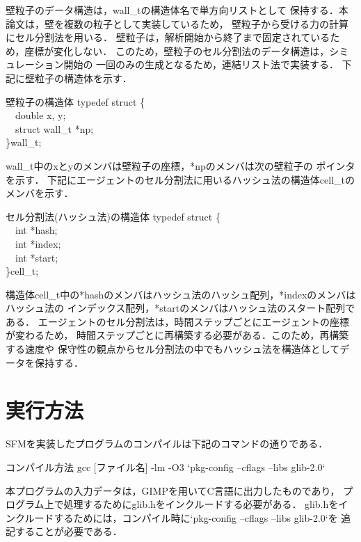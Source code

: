 壁粒子のデータ構造は，wall\_tの構造体名で単方向リストとして
保持する．本論文は，壁を複数の粒子として実装しているため，
壁粒子から受ける力の計算にセル分割法を用いる．
壁粒子は，解析開始から終了まで固定されているため，座標が変化しない．
このため，壁粒子のセル分割法のデータ構造は，シミュレーション開始の
一回のみの生成となるため，連結リスト法で実装する．
下記に壁粒子の構造体を示す．
%
\begin{itembox}[l]{壁粒子の構造体}
typedef struct \{\\
　double x, y;\\
　struct wall\_t *np;\\ 
\}wall\_t;
\end{itembox}
%
wall\_t中のxとyのメンバは壁粒子の座標，*npのメンバは次の壁粒子の
ポインタを示す．
下記にエージェントのセル分割法に用いるハッシュ法の構造体cell\_tの
メンバを示す．
\begin{itembox}[l]{セル分割法(ハッシュ法)の構造体}
typedef struct \{\\
　int *hash;\\
　int *index;\\
　int *start;\\
\}cell\_t;
\end{itembox}
構造体cell\_t中の*hashのメンバはハッシュ法のハッシュ配列，*indexのメンバはハッシュ法の
インデックス配列，*startのメンバはハッシュ法のスタート配列である．
エージェントのセル分割法は，時間ステップごとにエージェントの座標が変わるため，
時間ステップごとに再構築する必要がある．このため，再構築する速度や
保守性の観点からセル分割法の中でもハッシュ法を構造体としてデータを保持する．

\section{実行方法}
SFMを実装したプログラムのコンパイルは下記のコマンドの通りである．
\begin{itembox}[l]{コンパイル方法}
  gcc [ファイル名] -lm -O3 `pkg-config --cflags --libs glib-2.0`
\end{itembox}
本プログラムの入力データは，GIMPを用いてC言語に出力したものであり，
プログラム上で処理するためにglib.hをインクルードする必要がある．
glib.hをインクルードするためには，コンパイル時に`pkg-config --cflags --libs glib-2.0`を
追記することが必要である．

